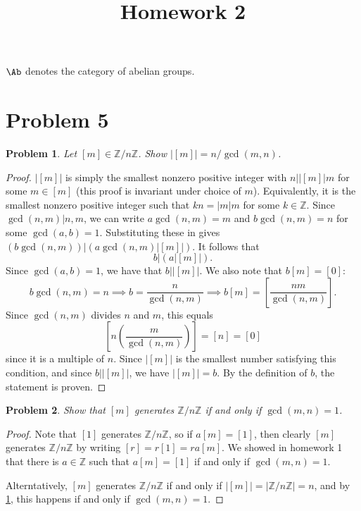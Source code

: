 \documentclass[11pt, letterpaper]{article}
\title{Homework 2}
\theoremstyle{plain}
\newtheorem{problem}{Problem}[section]
\begin{document}
\makeproblem

\begin{notation}
	$\Ab $ denotes the category of abelian groups.
\end{notation}

\setcounter{section}{4}
\section{Problem 5}
\begin{problem}\label{5.1}
	Let $[m]\in\mathbb{Z} /n\mathbb{Z} $. Show $\left| [m] \right| =n/\operatorname{gcd} (m,n)$.
\end{problem}
\begin{proof}
	$\left| [m] \right| $ is simply the smallest nonzero positive integer with $n|\left| [m] \right| m$ for some $m\in [m]$ (this proof is invariant under choice of $m$). Equivalently, it is the smallest nonzero positive integer such that $kn=\left| m \right| m$ for some $k\in\mathbb{Z} $. Since $\operatorname{gcd} (n,m)|n,m$, we can write $a \operatorname{gcd} (n,m)=m$ and $b \operatorname{gcd} (n,m)=n$ for some $\operatorname{gcd} (a,b)=1$. Substituting these in gives $(b \operatorname{gcd} (n,m))|(a \operatorname{gcd} (n,m)\left| [m] \right|) $. It follows that
	\[
		b|(a \left| [m] \right| )
	.\]
	Since $\operatorname{gcd} (a,b)=1$, we have that $b|\left| [m] \right| $. We also note that $b[m]=[0]$:
	\[
		b \operatorname{gcd} (n,m)=n \implies b=\frac{n}{\operatorname{gcd} (n,m)} \implies b[m]=\left[ \frac{nm}{\operatorname{gcd} (n,m)}  \right] 
	.\]
	Since $\operatorname{gcd} (n,m)$ divides $n$ and $m$, this equals
	\[
		\left[ n \left( \frac{m}{\operatorname{gcd} (n,m)}  \right)  \right] =[n]=[0]
	\]
	since it is a multiple of $n$.	Since $\left| [m] \right| $ is the smallest number satisfying this condition, and since $b|\left| [m] \right| $, we have $\left| [m] \right| =b$. By the definition of $b$, the statement is proven.
\end{proof}

\begin{problem}
	Show that $[m]$ generates $\mathbb{Z} /n\mathbb{Z} $ if and only if $\operatorname{gcd} (m,n)=1$.
\end{problem}
\begin{proof}
	Note that $[1]$ generates $\mathbb{Z} /n\mathbb{Z} $, so if $a[m]=[1]$, then clearly $[m]$ generates $\mathbb{Z} /n\mathbb{Z} $ by writing $[r]=r[1]=ra[m]$. We showed in homework 1 that there is $a\in\mathbb{Z} $ such that $a[m]=[1]$ if and only if $\operatorname{gcd} (m,n)=1$.

	Alterntatively, $[m]$ generates $\mathbb{Z} /n\mathbb{Z} $ if and only if $\left| [m] \right| =\left| \mathbb{Z} /n\mathbb{Z}  \right| =n$, and by \cref{5.1}, this happens if and only if $\operatorname{gcd} (m,n)=1$.
\end{proof}
\end{document}
